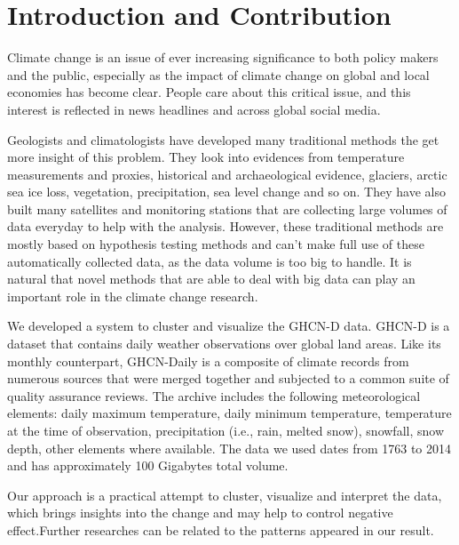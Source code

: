 \section{Introduction and Contribution}
Climate change is an issue of ever increasing significance to both policy makers and the public, especially as the impact of climate change on global and local economies has become clear. People care about this critical issue, and this interest is reflected in news headlines and across global social media.

Geologists and climatologists have developed many traditional methods the get more insight of this problem. They look into evidences from temperature measurements and proxies, historical and archaeological evidence, glaciers, arctic sea ice loss, vegetation, precipitation, sea level change and so on. They have also built many satellites and monitoring stations that are collecting large volumes of data everyday to help with the analysis. However, these traditional methods are mostly based on hypothesis testing methods and can't make full use of these automatically collected data, as the data volume is too big to handle. It is natural that novel methods that are able to deal with big data can play an important role in the climate change research.

We developed a system to cluster and visualize the GHCN-D data\cite{GHCN-D}.
GHCN-D is a dataset that contains daily weather observations over global land areas.
Like its monthly counterpart, GHCN-Daily is a composite of climate records from
numerous sources that were merged together and subjected to a common suite of quality assurance reviews. The archive includes the following meteorological elements: daily maximum temperature, daily minimum temperature, temperature at the time of observation, precipitation (i.e., rain, melted snow), snowfall, snow depth, other elements where available. The data we used dates from 1763 to 2014 and has approximately 100 Gigabytes total volume.

Our approach is a practical attempt to cluster, visualize and interpret the data, which brings insights into the change and may help to control negative effect.Further researches can be related to the patterns appeared in our result.



